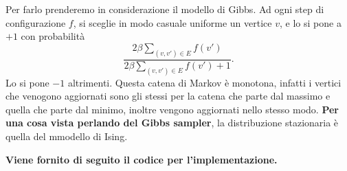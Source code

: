 \documentclass[]{marticle}
\begin{document}
Per farlo prenderemo in considerazione il modello di Gibbs. Ad ogni step di
configurazione $f$, si sceglie in modo casuale uniforme un vertice $v$, e lo si
pone a $+1$ con probabilit\`a
\[
    \frac{2\beta\sum_{(v,v')\in E} f(v')} {2\beta\sum_{(v,v')\in E}
    f(v')+1}.
\]
Lo si pone $-1$ altrimenti. Questa catena di Markov \`e monotona, infatti i
vertici che venogono aggiornati sono gli stessi per la catena che parte dal
massimo e quella che parte dal minimo, inoltre vengono aggiornati nello stesso
modo. \textbf{Per una cosa vista perlando del Gibbs sampler}, la distribuzione
stazionaria \`e quella del mmodello di Ising. 

\textbf{Viene fornito di seguito il codice per l'implementazione.}
\end{document}
